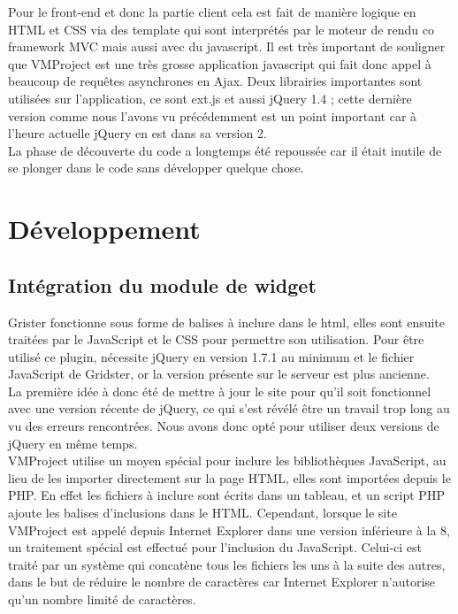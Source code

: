 \documentclass[12pt]{report}
\begin{document}
Pour le front-end et donc la partie client cela est fait de manière logique en HTML et CSS via des template qui sont interprétés par le moteur de rendu co framework MVC mais aussi avec du javascript. Il est très important de souligner que VMProject est une très grosse application javascript qui fait donc appel à beaucoup de requêtes asynchrones en Ajax. Deux librairies importantes sont utilisées sur l'application, ce sont ext.js et aussi jQuery 1.4 ; cette dernière version comme nous l'avons vu précédemment est un point important car à l'heure actuelle jQuery en est dans sa version 2.\\

La phase de découverte du code a longtemps été repoussée car il était inutile de se plonger dans le code sans développer quelque chose.\\
	\section{Développement}
	
	\subsection{Intégration du module de widget}
	
	Grister fonctionne sous forme de balises à inclure dans le html, elles sont ensuite traitées par le JavaScript et le CSS pour permettre son utilisation.
Pour être utilisé ce plugin, nécessite jQuery en version 1.7.1 au minimum et le fichier JavaScript de Gridster, or la version présente sur le serveur est plus ancienne.\\
	
	
La première idée à donc été de mettre à jour le site pour qu’il soit fonctionnel avec une version récente de jQuery, ce qui s'est révélé être un travail trop long au vu des erreurs rencontrées. Nous avons donc opté pour utiliser deux versions de jQuery en même temps.\\
	

VMProject utilise un moyen spécial pour inclure les bibliothèques JavaScript, au lieu de les importer directement sur la page HTML, elles sont importées depuis le PHP. En effet les fichiers à inclure sont écrits dans un tableau, et un script PHP ajoute les balises d’inclusions dans le HTML. Cependant, lorsque le site VMProject est appelé depuis Internet Explorer dans une version inférieure à la 8, un traitement spécial est effectué pour l’inclusion du JavaScript. Celui-ci est traité par un système qui concatène tous les fichiers les uns à la suite des autres, dans le but de réduire le nombre de caractères car Internet Explorer n’autorise qu’un nombre limité de caractères.\\
	
\end{document}
